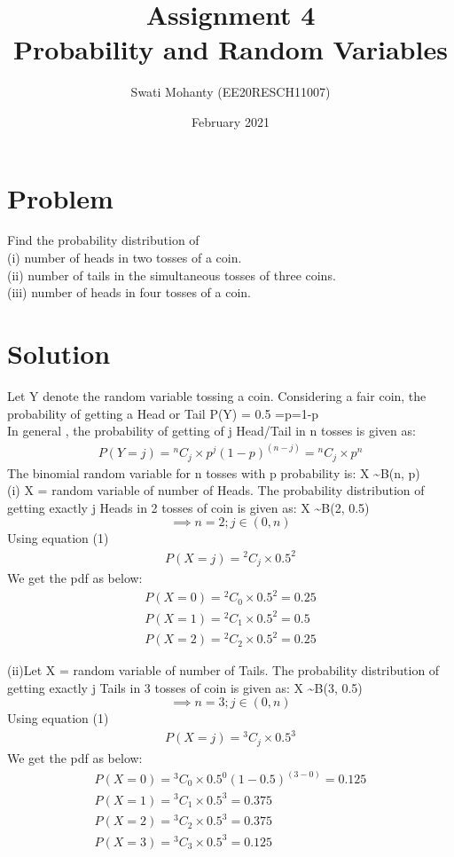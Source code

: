 \documentclass[journal,12pt,twocolumn]{IEEEtran}
\title{Assignment 4
\\Probability and Random Variables }
\author{Swati Mohanty (EE20RESCH11007) }
\date{February 2021}
\newcommand*{\Comb}[2]{{}^{#1}C_{#2}}%
\begin{document}
\maketitle


\section{Problem}
Find the probability distribution of
\\(i) number of heads in two tosses of a coin.
\\(ii) number of tails in the simultaneous tosses
of three coins.
\\(iii) number of heads in four tosses of a coin.

\section{Solution}
Let Y denote the random variable tossing a coin. Considering a fair coin, the probability of getting a Head or Tail P(Y) = 0.5 =p=1-p
\\In general , the probability of getting of j Head/Tail in n tosses is given as:
\begin{align}
    P(Y = j) = \Comb{n}{j}\times { p^j (1-p)^{(n-j)}} = \Comb{n}{j}\times { p^n } 
\end{align}
The binomial random variable for n tosses with p probability is:
X \textasciitilde B(n, p) 
\\(i)
 X = random variable of number of Heads.
The probability distribution of getting exactly j Heads in 2 tosses of coin is given as: X \textasciitilde B(2, 0.5)
 \[\implies n=2; j \in (0,n)\]
Using equation (1)
\begin{align}
    P(X = j)  =\Comb{2}{j}\times { 0.5^2}
\end{align}
We get the pdf as below:
\begin{align}
    P(X=0) =\Comb{2}{0}\times { 0.5^2}
    =0.25
    \\P(X=1) = \Comb{2}{1}\times { 0.5^2} = 0.5
    \\P(X=2) = \Comb{2}{2}\times { 0.5^2} = 0.25
\end{align}


(ii)Let X = random variable of number of Tails.
The probability distribution of getting exactly j Tails in 3 tosses of coin is given as: X \textasciitilde B(3, 0.5) 
\[\implies n=3; j \in (0,n)\]
Using equation (1)
\begin{align}
    P(X = j)  =\Comb{3}{j}\times { 0.5^3}
\end{align}
We get the pdf as below:
\begin{align}
    P(X=0) = \Comb{3}{0}\times { 0.5^0 (1-0.5)^{(3-0)}}
    =0.125
    \\P(X=1) = \Comb{3}{1}\times { 0.5^3} = 0.375
    \\P(X=2) = \Comb{3}{2}\times { 0.5^3} = 0.375
    \\P(X=3) = \Comb{3}{3}\times { 0.5^3} = 0.125
\end{align}
\end{document}
